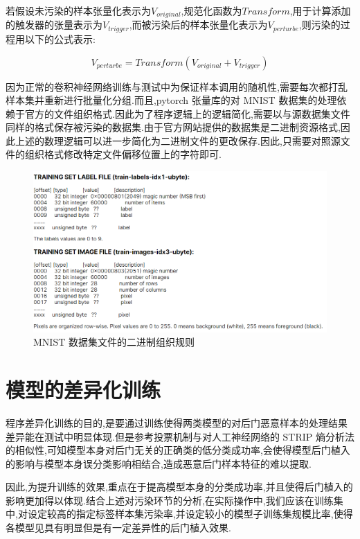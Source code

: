 若假设未污染的样本张量化表示为$V_{original}$,规范化函数为$Transform$,用于计算添加的触发器的张量表示为$V_{trigger}$,而被污染后的样本张量化表示为$V_{perturbe}$,则污染的过程用以下的公式表示:

\begin{equation}
V_{perturbe}=Transform(V_{original}+V_{trigger}) 
\end{equation}

因为正常的卷积神经网络训练与测试中为保证样本调用的随机性,需要每次都打乱样本集并重新进行批量化分组.而且,pytorch 张量库的对 MNIST 数据集的处理依赖于官方的文件组织格式.因此为了程序逻辑上的逻辑简化,需要以与源数据集文件同样的格式保存被污染的数据集.由于官方网站提供的数据集是二进制资源格式,因此上述的数理逻辑可以进一步简化为二进制文件的更改保存.因此,只需要对照源文件的组织格式修改特定文件偏移位置上的字符即可.

\begin{figure}[H]
	\centering
	\includegraphics[scale=0.5]{Figures/rule.png}
	\caption{MNIST 数据集文件的二进制组织规则}
\end{figure}

\section{模型的差异化训练}

程序差异化训练的目的,是要通过训练使得两类模型的对后门恶意样本的处理结果差异能在测试中明显体现.但是参考投票机制与对人工神经网络的 STRIP 熵分析法的相似性,可知模型本身对后门无关的正确类的低分类成功率,会使得模型后门植入的影响与模型本身误分类影响相结合,造成恶意后门样本特征的难以提取.

因此,为提升训练的效果,重点在于提高模型本身的分类成功率,并且使得后门植入的影响更加得以体现.结合上述对污染环节的分析,在实际操作中,我们应该在训练集中,对设定较高的指定标签样本集污染率,并设定较小的模型子训练集规模比率,使得各模型见具有明显但是有一定差异性的后门植入效果.


